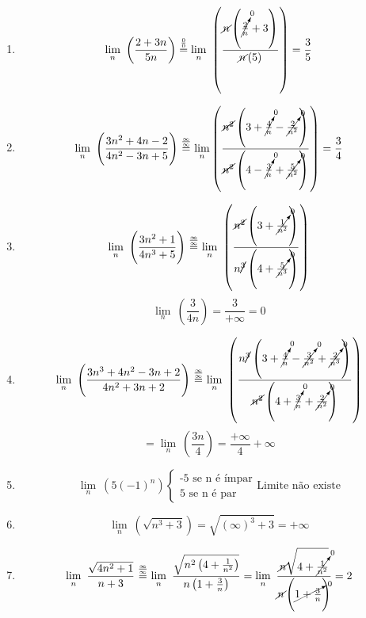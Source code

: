\documentclass[20pt, a4paper]{extarticle}
\begin{document}
\begin{questoes}
\begin{enumerate}[label=\alph*)]
\end{enumerate}
\item
\begin{enumerate}[label=\alph*)]
	\item \[\lim\limits_{n}\ \left(\frac{2+3n}{5n}\right) \overset{\mathrm{\frac{0}{0}}}{=} \lim\limits_{n}\ \left(\frac{\cancel{n}\left(\cancelto{0}{\frac{2}{n}}+3\right)}{\cancel{n}\left(5\right)}\right) = \frac{3}{5}\]
	
	\item \[\lim\limits_{n}\ \left(\frac{3n^2+4n-2}{4n^2-3n+5}\right) \overset{\mathrm{\frac{\infty}{\infty}}}{=}
	\lim\limits_{n} \left(\frac{\cancel{n^2}\left(3+\cancelto{0}{\frac{4}{n}}-\cancelto{0}{\frac{2}{n^2}}\right)}{\cancel{n^2}\left(4-\cancelto{0}{\frac{3}{n}}+\cancelto{0}{\frac{5}{n^2}}\right)}\right) =\frac{3}{4}\]
	
	\item \[\lim\limits_{n}\ \left(\frac{3n^2+1}{4n^3+5}\right) \overset{\mathrm{\frac{\infty}{\infty}}}{=}	\lim\limits_{n}\ \left(\frac{\cancel{n^2}\left(3+\cancelto{0}{\frac{1}{n^2}}\right)}{n\cancel{^3}\left(4+\cancelto{0}{\frac{5}{n^3}}\right)}\right) \]
	\[\lim\limits_{n}\ \left(\frac{3}{4n}\right) = \frac{3}{+\infty} = 0\]
	
	\item \[\lim\limits_{n}\ \left(\frac{3n^3+4n^2-3n+2}{4n^2+3n+2}\right) \overset{\mathrm{\frac{\infty}{\infty}}}{=} \lim\limits_{n}\ \left(\frac{n\cancel{^3}\left(3+\cancelto{0}{\frac{4}{n}}-\cancelto{0}{\frac{3}{n^2}}+\cancelto{0}{\frac{2}{n^3}}\right)}{\cancel{n^2}\left(4+\cancelto{0}{\frac{3}{n}}+\cancelto{0}{\frac{2}{n^2}}\right)}\right)\]
	\[ = \lim\limits_{n}\ \left(\frac{3n}{4}\right) = \frac{+\infty}{4} +\infty\]
	
	\item \[\lim\limits_{n}\ \left(5\left(-1\right)^n\right) \begin{cases}
		\text{-5 se n é ímpar}\\ 
		\text{5 se n é par}    
	\end{cases}
\text{Limite não existe}
\]
	\item \[\lim\limits_{n}\ \left(\sqrt{n^3+3}\right) = \sqrt{\left(\infty\right)^3+3} = +\infty\]
	
	\item \[\lim\limits_{n}\ \frac{\sqrt{4n^2+1}}{n+3} \overset{\mathrm{\frac{\infty}{\infty}}}{=} \lim\limits_{n}\	 \frac{\sqrt{n^2\left(4+\frac{1}{n^2}\right)}}{n\left(1+\frac{3}{n}\right)} =\lim\limits_{n}\ \frac{\cancel{n}\sqrt{4+\cancelto{0}{\frac{1}{n^2}}}}{\cancel{n}\left(\cancelto{0}{1+\frac{3}{n}}\right)}= 2\]
	

\end{enumerate}
\end{questoes}
\end{document}
